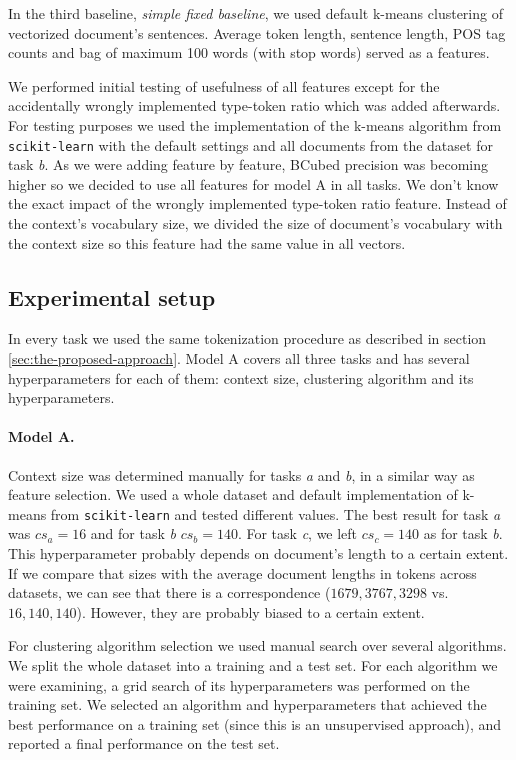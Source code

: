 \documentclass[10pt, a4paper]{article}
\begin{document}
In the third baseline, \textit{simple fixed baseline}, we used default k-means clustering of vectorized document's sentences. Average token length, sentence length, POS tag counts and bag of maximum 100 words (with stop words) served as a features.

We performed initial testing of usefulness of all features except for the accidentally wrongly implemented type-token ratio which was added afterwards. For testing purposes we used the implementation of the k-means algorithm from \texttt{scikit-learn} with the default settings and all documents from the dataset for task \emph{b}. As we were adding feature by feature, BCubed precision was becoming higher so we decided to use all features for model A in all tasks. We don't know the exact impact of the wrongly implemented type-token ratio feature. Instead of the context's vocabulary size, we divided the size of document's vocabulary with the context size so this feature had the same value in all vectors.


\subsection{Experimental setup}
In every task we used the same tokenization procedure as described in section \ref{sec:the-proposed-approach}. Model A covers all three tasks and has several hyperparameters for each of them: context size, clustering algorithm and its hyperparameters.

\paragraph{Model A.}Context size was determined manually for tasks \emph{a} and \emph{b}, in a similar way as feature selection. We used a whole dataset and default implementation of k-means from \texttt{scikit-learn} and tested different values. The best result for task \emph{a} was $cs_a=16$ and for task \emph{b} $cs_b=140$. For task \emph{c}, we left $cs_c=140$ as for task \emph{b}. This hyperparameter probably depends on document's length to a certain extent. If we compare that sizes with the average document lengths in tokens across datasets, we can see that there is a correspondence ($1679, 3767, 3298$ vs. $16, 140, 140$). However, they are probably biased to a certain extent.

For clustering algorithm selection we used manual search over several algorithms. We split the whole dataset into a training and a test set. For each algorithm we were examining, a grid search of its hyperparameters was performed on the training set. We selected an algorithm and hyperparameters that achieved the best performance on a training set (since this is an unsupervised approach), and reported a final performance on the test set.
\end{document}
